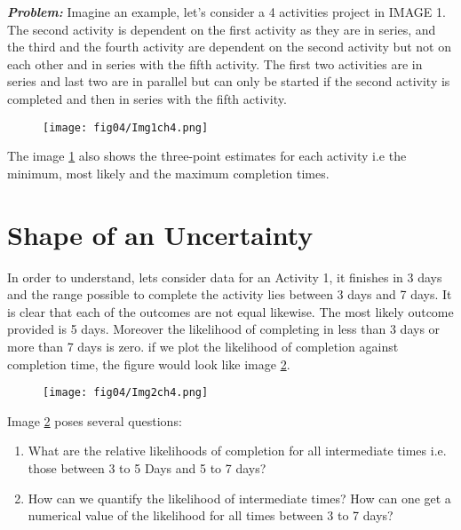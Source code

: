 \emph{\textbf{Problem:}} Imagine an example, let's consider a 4 activities project in IMAGE 1. The second activity is dependent on the first activity as they are in series, and the third and the fourth activity are dependent on the second activity but not on each other and in series with the fifth activity. The first two activities are in series and last two are in parallel but can only be started if the second activity is completed and then in series with the fifth activity.


\begin{figure}
	\centering
	\texttt{[image: fig04/Img1ch4.png]}
	\label{img1ch4}
\end{figure}

The image \ref{img1ch4} also shows the three-point estimates for each activity i.e the minimum, most likely and the maximum completion times.


\section{Shape of an Uncertainty}
	
In order to understand, lets consider data for an Activity 1, it finishes in 3 days and the range possible to complete the activity lies between 3 days and 7 days. It is clear that each of the outcomes are not equal likewise. The most likely outcome provided is 5 days. Moreover the likelihood of completing in less than 3 days or more than 7 days is zero. if we plot the likelihood of completion against completion time, the figure would look like image \ref{img2ch4}.


\begin{figure}
	\centering
	\texttt{[image: fig04/Img2ch4.png]}
	\label{img2ch4}
\end{figure}

Image \ref{img2ch4} poses several questions:

\begin{enumerate}
	\item What are the relative likelihoods of completion for all intermediate times i.e. those between 3 to 5 Days and 5 to 7 days?
	\item  How can we quantify the likelihood of intermediate times? How can one get a numerical value of the likelihood for all times between 3 to 7 days?  
\end{enumerate}

